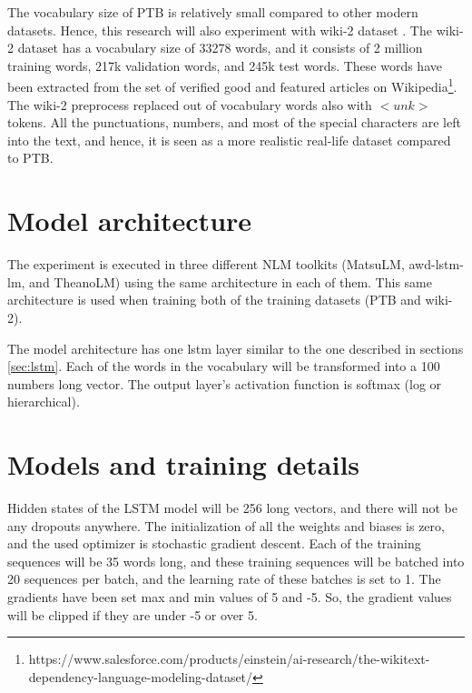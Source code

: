 The vocabulary size of PTB is relatively small compared to other modern datasets. Hence, this research will also experiment with wiki-2 dataset \textcite{merity2016pointer}. The wiki-2 dataset has a vocabulary size of 33278 words, and it consists of 2 million training words, 217k validation words, and 245k test words. These words have been extracted from the set of verified good and featured articles on Wikipedia\footnote{https://www.salesforce.com/products/einstein/ai-research/the-wikitext-dependency-language-modeling-dataset/}. The wiki-2 preprocess replaced out of vocabulary words also with $<unk>$ tokens. All the punctuations, numbers, and most of the special characters are left into the text, and hence, it is seen as a more realistic real-life dataset compared to PTB.


\section{Model architecture}

The experiment is executed in three different NLM toolkits (MatsuLM, awd-lstm-lm, and TheanoLM) using the same architecture in each of them. This same architecture is used when training both of the training datasets (PTB and wiki-2). 

The model architecture has one lstm layer similar to the one described in sections \ref{sec:lstm}. Each of the words in the vocabulary will be transformed into a 100 numbers long vector. The output layer's activation function is softmax (log or hierarchical).

\section{Models and training details}

Hidden states of the LSTM model will be 256 long vectors, and there will not be any dropouts anywhere. The initialization of all the weights and biases is zero, and the used optimizer is stochastic gradient descent. Each of the training sequences will be 35 words long, and these training sequences will be batched into 20 sequences per batch, and the learning rate of these batches is set to 1. The gradients have been set max and min values of 5 and -5. So, the gradient values will be clipped if they are under -5 or over 5. 

